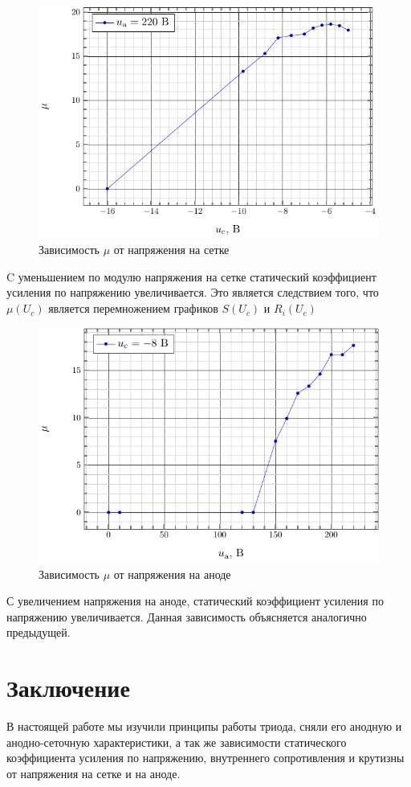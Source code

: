 \documentclass[a5paper,11pt]{extarticle}
\begin{document}
\begin{figure}[H]
	\centering
	\includegraphics[]{fig/mu_from_uc.pdf}
	\vspace{-1em}
	\caption{Зависимость $\mu$ от напряжения на сетке}
	\label{fig:1}
\end{figure}
C уменьшением по модулю напряжения на сетке статический коэффициент усиления по напряжению увеличивается. Это является следствием того, что $\mu(U_c)$ является перемножением графиков $S(U_c)$ и $R_i(U_c)$
\begin{figure}[H]
	\centering
	\includegraphics[]{fig/mu_from_ua.pdf}
	\vspace{-1em}
	\caption{Зависимость $\mu$ от напряжения на аноде}
	\label{fig:1}
\end{figure}
С увеличением напряжения на аноде, статический коэффициент усиления по напряжению увеличивается.
Данная зависимость объясняется аналогично предыдущей.

\section*{Заключение}
В настоящей работе мы изучили принципы работы триода, сняли его анодную и анодно-сеточную характеристики, а так же зависимости статического коэффициента усиления по напряжению, внутреннего сопротивления и крутизны от напряжения на сетке и на аноде. 
\end{document}
